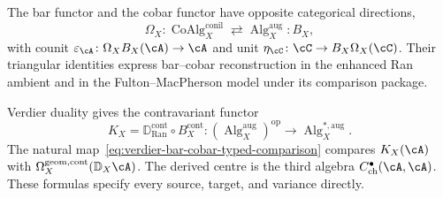 \begin{remark}
\label{rem:cobar-as-koszul-reflection-inverse}
%
The bar functor and the cobar functor have opposite categorical
directions,
\[
\Omega_X\colon\operatorname{CoAlg}^{\mathrm{conil}}_X
\rightleftarrows
\operatorname{Alg}^{\mathrm{aug}}_X:B_X,
\]
with counit
$\varepsilon_\cA\colon\Omega_XB_X(\cA)\to\cA$ and unit
$\eta_\cC\colon\cC\to B_X\Omega_X(\cC)$.  Their triangular
identities express bar--cobar reconstruction in the enhanced Ran
ambient and in the Fulton--MacPherson model under its comparison
package.

Verdier duality gives the contravariant functor
\[
K_X=\mathbb D_{\operatorname{Ran}}^{\mathrm{cont}}\circ B_X^{\mathrm{cont}}
\colon
(\operatorname{Alg}^{\mathrm{aug}}_X)^{\mathrm{op}}\longrightarrow
\operatorname{Alg}^{*,\mathrm{aug}}_X.
\]
The natural map~\eqref{eq:verdier-bar-cobar-typed-comparison} compares
$K_X(\cA)$ with $\Omega_X^{\mathrm{geom,cont}}(\mathbb D_X\cA)$.
The derived centre is the third algebra
$C^\bullet_{\mathrm{ch}}(\cA,\cA)$.  These formulas specify every
source, target, and variance directly.
\end{remark}

